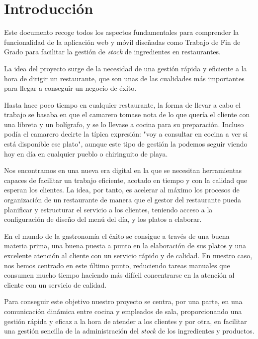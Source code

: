 \chapter{Introducción}
\label{cap:introduccion}

Este documento recoge todos los aspectos fundamentales para comprender la funcionalidad de la aplicación web y móvil diseñadas como Trabajo de Fin de Grado para facilitar la gestión de \textit{stock} de ingredientes en restaurantes.

La idea del proyecto surge de la necesidad de una gestión rápida y eficiente a la hora de dirigir un restaurante, que son unas de las cualidades más importantes para llegar a conseguir un negocio de éxito.

Hasta hace poco tiempo en cualquier restaurante, la forma de llevar a cabo el trabajo se basaba en que el camarero tomase nota de lo que quería el cliente con una libreta y un bolígrafo, y se lo llevase a cocina para su preparación. Incluso podía el camarero decirte la típica expresión: "voy a consultar en cocina a ver si está disponible ese plato", aunque este tipo de gestión la podemos seguir viendo hoy en día en cualquier pueblo o chiringuito de playa.

Nos encontramos en una nueva era digital en la que se necesitan herramientas capaces de facilitar un trabajo eficiente, acotado en tiempo y con la calidad que esperan los clientes. La idea, por tanto, es acelerar al máximo los procesos de organización de un restaurante de manera que el gestor del restaurante pueda planificar y estructurar el servicio a los clientes, teniendo acceso a la configuración de diseño del menú del día, y los platos a elaborar.

En el mundo de la gastronomía el éxito se consigue a través de una buena materia prima, una buena puesta a punto en la elaboración de sus platos y una excelente atención al cliente con un servicio rápido y de calidad. En nuestro caso, nos hemos centrado en este último punto, reduciendo tareas manuales que consumen mucho tiempo haciendo más difícil concentrarse en la atención al cliente con un servicio de calidad.

Para conseguir este objetivo nuestro proyecto se centra, por una parte, en una comunicación dinámica entre cocina y empleados de sala, proporcionando una gestión rápida y eficaz a la hora de atender a los clientes y por otra, en facilitar una gestión sencilla de la administración del \textit{stock} de los ingredientes y productos.


